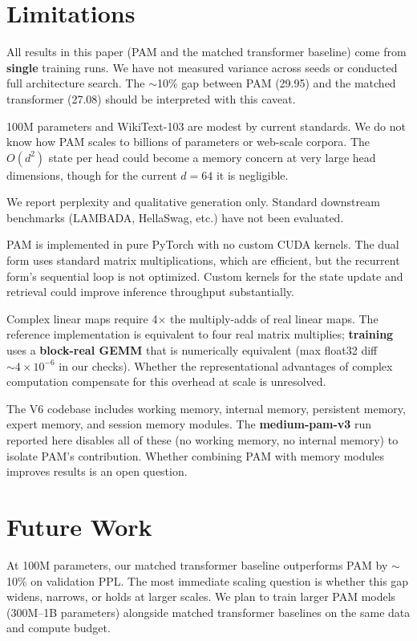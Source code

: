 \documentclass[11pt]{article}
\begin{document}
\section{Limitations}
All results in this paper (PAM and the matched transformer baseline) come from \textbf{single} training runs. We have not measured variance across seeds or conducted full architecture search. The $\sim$10\% gap between PAM (29.95) and the matched transformer (27.08) should be interpreted with this caveat.

100M parameters and WikiText-103 are modest by current standards. We do not know how PAM scales to billions of parameters or web-scale corpora. The $O(d^2)$ state per head could become a memory concern at very large head dimensions, though for the current $d = 64$ it is negligible.

We report perplexity and qualitative generation only. Standard downstream benchmarks (LAMBADA, HellaSwag, etc.) have not been evaluated.

PAM is implemented in pure PyTorch with no custom CUDA kernels. The dual form uses standard matrix multiplications, which are efficient, but the recurrent form's sequential loop is not optimized. Custom kernels for the state update and retrieval could improve inference throughput substantially.

Complex linear maps require 4$\times$ the multiply-adds of real linear maps. The reference implementation is equivalent to four real matrix multiplies; \textbf{training} uses a \textbf{block-real GEMM} that is numerically equivalent (max float32 diff $\sim 4\times 10^{-6}$ in our checks). Whether the representational advantages of complex computation compensate for this overhead at scale is unresolved.

The V6 codebase includes working memory, internal memory, persistent memory, expert memory, and session memory modules. The \textbf{medium-pam-v3} run reported here disables all of these (no working memory, no internal memory) to isolate PAM's contribution. Whether combining PAM with memory modules improves results is an open question.

\section{Future Work}
At 100M parameters, our matched transformer baseline outperforms PAM by $\sim$10\% on validation PPL. The most immediate scaling question is whether this gap widens, narrows, or holds at larger scales. We plan to train larger PAM models (300M--1B parameters) alongside matched transformer baselines on the same data and compute budget.
\end{document}
